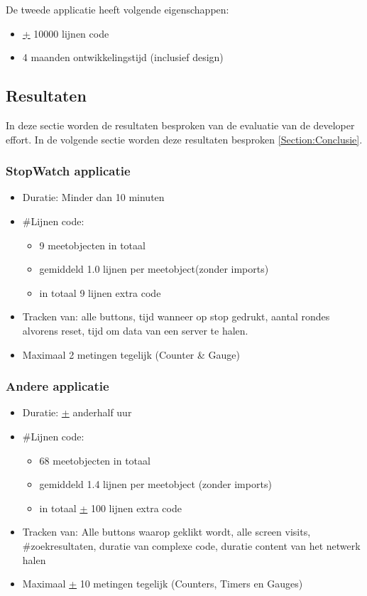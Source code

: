 De tweede applicatie heeft volgende eigenschappen:
\begin{itemize}
\item \underline{+} 10000 lijnen code
\item 4 maanden ontwikkelingstijd (inclusief design)
\end{itemize}

\subsection{Resultaten}
In deze sectie worden de resultaten besproken van de evaluatie van de developer effort. In de volgende sectie worden deze resultaten besproken \ref{Section:Conclusie}.
\subsubsection{StopWatch applicatie}
\begin{itemize}
\item ​​Duratie: Minder dan 10 minuten
\item \#Lijnen code:\begin{itemize}
\item 9 meetobjecten in totaal
\item ​gemiddeld 1.0 lijnen per meetobject(zonder imports)
\item in totaal 9 lijnen extra code
\end{itemize}

\item ​​​Tracken van: alle buttons, tijd wanneer op stop gedrukt, aantal rondes alvorens reset, tijd om data van een server te halen.

\item Maximaal 2 metingen tegelijk (Counter \& Gauge)
\end{itemize}




\subsubsection{Andere applicatie}
\begin{itemize}
\item ​Duratie: \underline{+} anderhalf uur
\item \#​Lijnen code: \begin{itemize}
\item 68 meetobjecten in totaal
\item ​​gemiddeld 1.4 lijnen per meetobject (zonder imports)
\item in totaal \underline{+} 100 lijnen extra code
\end{itemize}

\item ​Tracken van: Alle buttons waarop geklikt wordt, alle screen visits, \#zoekresultaten, duratie van complexe code, duratie content van het netwerk halen
\item Maximaal \underline{+} 10 metingen tegelijk (Counters, Timers en Gauges)
\end{itemize}


